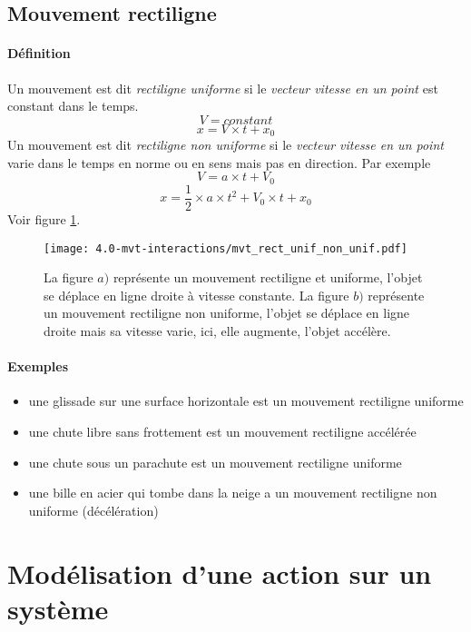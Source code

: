 \subsection{Mouvement rectiligne }
\paragraph{Définition} Un mouvement est dit \textit{rectiligne uniforme} si le \textit{vecteur vitesse en un point} est constant dans le temps.
$$ V = \textit{constant} $$
$$ x = V \times t + x_0 $$
Un mouvement est dit \textit{rectiligne non uniforme} si le \textit{vecteur vitesse en un point} varie dans le temps en norme ou en sens mais pas en direction. Par exemple
$$ V = a \times t  + V_0 $$
$$ x = \frac{1}{2}\times a \times t^2 + V_0 \times t + x_0 $$
Voir figure \ref{fig:mvt_rec_unif}.
\begin{figure}[h!]
  \begin{center}
      \texttt{[image: 4.0-mvt-interactions/mvt\_rect\_unif\_non\_unif.pdf]}
  \end{center}
  \caption{La figure $a)$ représente un mouvement rectiligne et uniforme, l'objet se déplace en ligne droite à vitesse constante. La figure $b)$ représente un mouvement rectiligne non uniforme, l'objet se déplace en ligne droite mais sa vitesse varie, ici, elle augmente, l'objet accélère.}
  \label{fig:mvt_rec_unif}
\end{figure}

\paragraph{Exemples}
\begin{itemize}
 \item une glissade sur une surface horizontale est un mouvement rectiligne uniforme
 \item une chute libre sans frottement est un mouvement rectiligne accélérée
 \item une chute sous un parachute est un mouvement rectiligne uniforme
 \item une bille en acier qui tombe dans la neige a un mouvement rectiligne non uniforme (décélération) 
\end{itemize}

\section{Modélisation d'une action sur un système}
